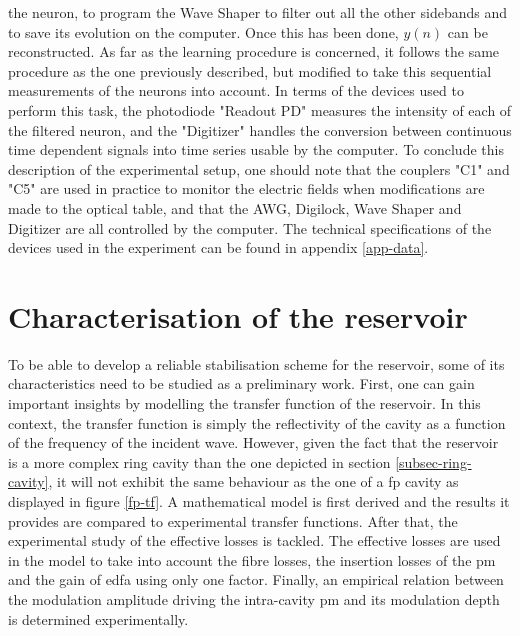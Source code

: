 the neuron, to program the Wave Shaper to filter out all the other sidebands and to save its evolution on the computer. Once this has been done, $y(n)$ can be reconstructed. As far as the learning procedure is concerned, it follows the same procedure as the one previously described, but modified to take this sequential measurements of the neurons into account. In terms of the devices used to perform this task, the photodiode "Readout PD" measures the intensity of each of the filtered neuron, and the "Digitizer" handles the conversion between continuous time dependent signals into time series usable by the computer. To conclude this description of the experimental setup, one should note that the couplers "C1" and "C5" are used in practice to monitor the electric fields when modifications are made to the optical table, and that the AWG, Digilock, Wave Shaper and Digitizer are all controlled by the computer. The technical specifications of the devices used in the experiment can be found in appendix \ref{app-data}.


\section{Characterisation of the reservoir}

To be able to develop a reliable stabilisation scheme for the reservoir, some of its characteristics need to be studied as a preliminary work. First, one can gain important insights by modelling the transfer function of the reservoir. In this context, the transfer function is simply the reflectivity of the cavity as a function of the frequency of the incident wave. However, given the fact that the reservoir is a more complex ring cavity than the one depicted in section \ref{subsec-ring-cavity}, it will not exhibit the same behaviour as the one of a \gls{fp} cavity as displayed in figure \ref{fp-tf}. A mathematical model is first derived and the results it provides are compared to experimental transfer functions. After that, the experimental study of the effective losses is tackled. The effective losses are used in the model to take into account the fibre losses, the insertion losses of the \gls{pm} and the gain of \gls{edfa} using only one factor. Finally, an empirical relation between the modulation amplitude driving the intra-cavity \gls{pm} and its modulation depth is determined experimentally.


